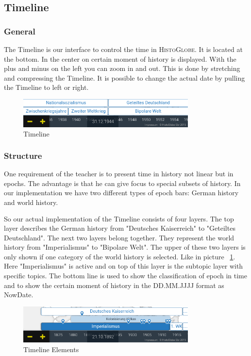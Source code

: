 \subsection{Timeline} %
\label{sub:timeline}

\subsubsection{General}
The Timeline is our interface to control the time in \textsc{HistoGlobe}. It is located at the bottom. In the center on certain moment of history is displayed. With the plus and minus on the left you can zoom in and out. This is done by stretching and compressing the Timeline. It is possible to change the actual date by pulling the Timeline to left or right.

\begin{figure}[H]
	\centering
	\includegraphics[width=0.8\textwidth]{graphics/timeline_now.png}
	\caption{Timeline}
\end{figure}

\subsubsection{Structure}
One requirement of the teacher is to present time in history not linear but in epochs. The advantage is that he can give focus to special subsets of history. In our implementation we have two different types of epoch bars: German history and world history.

So our actual implementation of the Timeline consists of four layers. The top layer describes the German history from "Deutsches Kaiserreich" to "Geteiltes Deutschland". The next two layers belong together. They represent the world history from "Imperialismus" to "Bipolare Welt". The upper of these two layers is only shown if one category of the world history is selected. Like in picture ~\ref{fig:Timeline_Elements}. Here "Imperialismus" is active and on top of this layer is the subtopic layer with specific topics. The bottom line is used to show the classification of epoch in time and to show the certain moment of history in the DD.MM.JJJJ format as NowDate.

\begin{figure}[H]
	\centering
	\includegraphics[width=0.8\textwidth]{graphics/timeline_elements.png}
	\caption{Timeline Elements}
	\label{fig:Timeline_Elements}
\end{figure}



